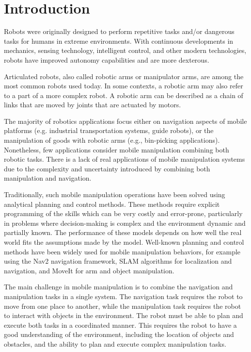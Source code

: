 \chapter*{Introduction}

Robots were originally designed to perform repetitive tasks
and/or dangerous tasks for humans in extreme environments.
With continuous developments in mechanics, sensing technology, intelligent control,
and other modern technologies, robots have improved autonomy capabilities and are more dexterous.

Articulated robots, also called robotic arms or manipulator arms, are among the most common robots used today. 
In some contexts, a robotic arm may also refer to a part of a more complex robot. A robotic arm can be
described as a chain of links that are moved by joints that are actuated by motors.

The majority of robotics applications focus either on navigation aspects of mobile platforms
(e.g. industrial transportation systems, guide robots), or the manipulation of goods
with robotic arms (e.g., bin-picking applications). Nonetheless, few applications consider mobile manipulation
combining both robotic tasks. There is a lack of real applications of mobile manipulation systems
due to the complexity and uncertainty introduced by combining both manipulation and navigation.

Traditionally, such mobile manipulation operations have been solved using analytical planning and control methods. 
These methods require explicit programming of the skills which can be very costly and error-prone, particularly
in problems where decision-making is complex and the environment dynamic and partially known.
The performance of these models depends on how well the real world fits the assumptions made by the model.
Well-known planning and control methods have been widely used for mobile manipulation behaviors, 
for example using the Nav2 navigation framework, SLAM algorithms for localization and navigation,
and MoveIt for arm and object manipulation.

The main challenge in mobile manipulation is to combine the navigation and manipulation tasks in a single system.
The navigation task requires the robot to move from one place to another, while the manipulation task requires the robot
to interact with objects in the environment. The robot must be able to plan and execute both tasks in a coordinated manner.
This requires the robot to have a good understanding of the environment, including the location of objects and obstacles,
and the ability to plan and execute complex manipulation tasks. 

